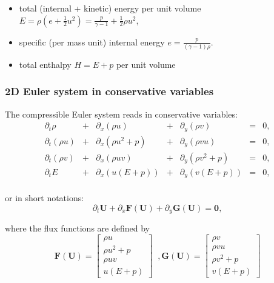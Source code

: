 \documentclass{article}
\begin{document}
\begin{itemize}
\item total (internal + kinetic) energy per unit volume $E = \rho \left( e + \frac{1}{2} u^2 \right) = \frac{p}{\gamma-1} + \frac{1}{2} \rho u^2$,
\item specific (per mass unit) internal energy $e=\frac{p}{(\gamma-1)\rho}$.
\item total enthalpy $H = E + p$ per unit volume
\end{itemize}


\subsubsection*{2D Euler system in conservative variables}
The compressible Euler system reads in conservative variables:\\
\begin{equation}
  \begin{array}{ccccccc}
    \partial_t \rho & + & \partial_x(\rho u) & + & \partial_y(\rho v) & = & 0,\\
    \partial_t (\rho u) & + & \partial_x(\rho u^2+p) & + & \partial_y(\rho v u) & = & 0,\\
    \partial_t (\rho v) & + & \partial_x(\rho u v) & + & \partial_y(\rho v^2+p) & = & 0,\\
    \partial_t E & + & \partial_x (u(E+p)) & + & \partial_y (v(E+p)) & = & 0,\\
  \end{array}
\end{equation}

or in short notations:
\begin{equation*}
  \partial_t \mathbf{U} + \partial_x \mathbf{F(U)} + \partial_y \mathbf{G(U)} = \mathbf{0},
\end{equation*}

where the flux functions are defined by
\begin{equation}
  \mathbf{F(U)} = \left [
  \begin{array}{c}
    \rho u \\
    \rho u^2 + p \\
    \rho u v \\
    u (E + p)
  \end{array} \right]
  \;\; ,
  \mathbf{G(U)} = \left [
  \begin{array}{c}
    \rho v \\
    \rho v u \\
    \rho v^2 + p \\
    v (E + p)
  \end{array} \right]
\end{equation}
\end{document}

